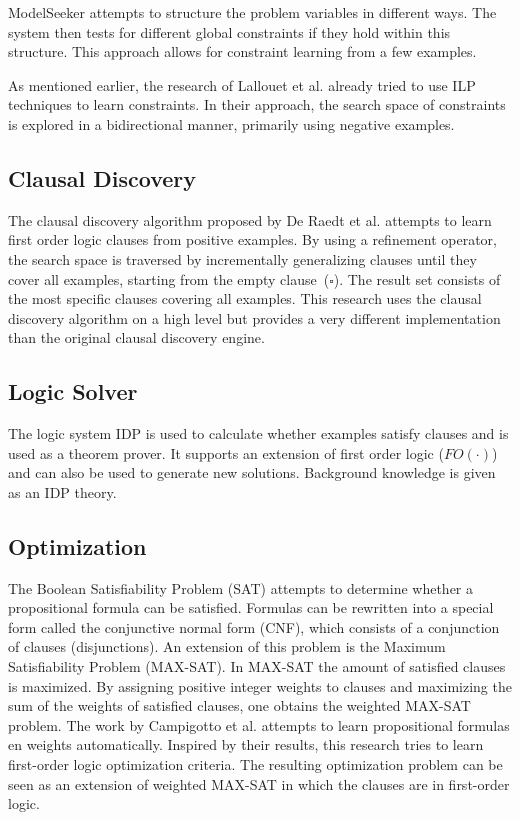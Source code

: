\documentclass{llncs}
\begin{document}
ModelSeeker\cite{Beldiceanu:ModelSeeker} attempts to structure the problem variables in different ways.
The system then tests for different global constraints if they hold within this structure.
This approach allows for constraint learning from a few examples.

As mentioned earlier, the research of Lallouet et al.\cite{Lallouet:LearningCP} already tried to use ILP techniques to learn constraints.
In their approach, the search space of constraints is explored in a bidirectional manner, primarily using negative examples.


\subsection{Clausal Discovery}
The clausal discovery algorithm proposed by De Raedt et al.\cite{DeRaedt:ClausalDiscovery} attempts to learn first order logic clauses from positive examples.
By using a refinement operator, the search space is traversed by incrementally generalizing clauses until they cover all examples, starting from the empty clause~($\square$).
The result set consists of the most specific clauses covering all examples.
This research uses the clausal discovery algorithm on a high level but provides a very different implementation than the original clausal discovery engine.

\subsection{Logic Solver}
The logic system IDP\cite{de2013prototype,wittocx2008idp} is used to calculate whether examples satisfy clauses and is used as a theorem prover.
It supports an extension of first order logic ($FO(\cdot)$) and can also be used to generate new solutions.
Background knowledge is given as an IDP theory.

\subsection{Optimization}
The Boolean Satisfiability Problem (SAT) attempts to determine whether a propositional formula can be satisfied.
Formulas can be rewritten into a special form called the conjunctive normal form (CNF), which consists of a conjunction of clauses (disjunctions).
An extension of this problem is the Maximum Satisfiability Problem (MAX-SAT).
In MAX-SAT the amount of satisfied clauses is maximized.
By assigning positive integer weights to clauses and maximizing the sum of the weights of satisfied clauses, one obtains the weighted MAX-SAT problem.
The work by Campigotto et al.\cite{campigotto2011active} attempts to learn propositional formulas en weights automatically.
Inspired by their results, this research tries to learn first-order logic optimization criteria.
The resulting optimization problem can be seen as an extension of weighted MAX-SAT in which the clauses are in first-order logic.
\end{document}
